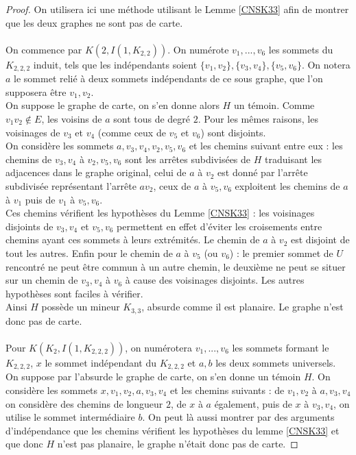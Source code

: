 \documentclass{scrartcl}
\begin{document}
\begin{flushleft}
\begin{proof}
    On utilisera ici une méthode utilisant le Lemme \ref{CNSK33} afin de montrer que les deux graphes ne sont pas de carte.
    \\~\\
    On commence par $K(2, I(1, K_{2,2}))$.
    On numérote $v_1, ..., v_6$ les sommets du $K_{2,2,2}$ induit, tels que les indépendants soient $\{v_1, v_2\}, \{v_3,v_4\}, \{v_5,v_6\}$.
    On notera $a$ le sommet relié à deux sommets indépendants de ce sous graphe, que l'on supposera être $v_1, v_2$.\\
    On suppose le graphe de carte, on s'en donne alors $H$ un témoin. Comme $v_1v_2 \notin E$, les voisins de $a$ sont tous de degré
    $2$. Pour les mêmes raisons, les voisinages de $v_3$ et $v_4$ (comme ceux de $v_5$ et $v_6$) sont disjoints.\\
    On considère les sommets $a, v_3, v_4, v_2, v_5, v_6$ et les chemins suivant entre eux : les chemins de $v_3, v_4$ à $v_2, v_5, v_6$
    sont les arrêtes subdivisées de $H$ traduisant les adjacences dans le graphe original, celui de $a$ à $v_2$ est donné par l'arrête
    subdivisée représentant l'arrête $av_2$, ceux de $a$ à $v_5, v_6$ exploitent les chemins de $a$ à $v_1$ puis de $v_1$ à $v_5, v_6$.\\
    Ces chemins vérifient les hypothèses du Lemme \ref{CNSK33} : les voisinages disjoints de $v_3, v_4$ et $v_5, v_6$ permettent
    en effet d'éviter les croisements entre chemins ayant ces sommets à leurs extrémités. Le chemin de $a$ à $v_2$ est disjoint
    de tout les autres. Enfin pour le chemin de $a$ à $v_5$ (ou $v_6$) : le premier sommet de $U$ rencontré ne peut être commun à un autre
    chemin, le deuxième ne peut se situer sur un chemin de $v_3, v_4$ à $v_6$ à cause des voisinages disjoints. Les autres hypothèses sont
    faciles à vérifier.\\
    Ainsi $H$ possède un mineur $K_{3,3}$, absurde comme il est planaire. Le graphe n'est donc pas de carte.
    \\~\\
    Pour $K(K_2, I(1, K_{2,2,2}))$, on numérotera $v_1, ..., v_6$ les sommets formant le $K_{2,2,2}$, $x$ le sommet indépendant du $K_{2,2,2}$
    et $a, b$ les deux sommets universels. On suppose par l'absurde le graphe de carte, on s'en donne un témoin $H$. On considère les sommets
    $x, v_1, v_2, a, v_3, v_4$ et les chemins suivants : de $v_1, v_2$ à $a, v_3, v_4$ on considère des chemins de longueur $2$, de
    $x$ à $a$ également, puis de $x$ à $v_3, v_4$, on utilise le sommet intermédiaire $b$. On peut là aussi montrer par des arguments
    d'indépendance que les chemins vérifient les hypothèses du lemme \ref{CNSK33} et que donc $H$ n'est pas planaire, le graphe
    n'était donc pas de carte.
\end{proof}


\end{flushleft}
\end{document}
